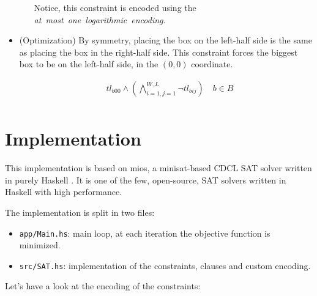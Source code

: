 \documentclass[12pt, a4paper]{article} %
\newcommand{\code}[1]{\texttt{#1}} %
\begin{document}
\begin{itemize}
\begin{itemize}
        Notice, this constraint is encoded using the \mbox{\textit{at most one logarithmic encoding}}.

    \end{itemize}

  \item (Optimization) By symmetry, placing the box on the left-half side is the same as placing the box in the right-half side. This constraint forces the biggest box to be on the left-half side, in the $(0,0)$ coordinate.

    \begin{equation}\label{eq:5}
      \begin{aligned}
        &tl_{b00} \land (\bigwedge\limits_{i=1,j=1}^{W,L} \neg tl_{bij}) \quad b \in B \\
      \end{aligned}
    \end{equation}
\end{itemize}

\newpage

\section{Implementation}%
\label{sec:Implementation}

This implementation is based on mios, a minisat-based CDCL SAT solver written in purely Haskell \cite{mios}. It is one of the few, open-source, SAT solvers written in Haskell with high performance.

The implementation is split in two files:

\begin{itemize}
  \item \code{app/Main.hs}: main loop, at each iteration the objective function is minimized.
  \item \code{src/SAT.hs}: implementation of the constraints, clauses and custom encoding.
\end{itemize}

Let's have a look at the encoding of the constraints:
\end{document}
